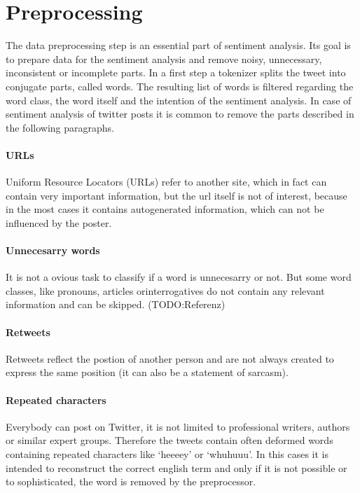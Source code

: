 \section{Preprocessing}
The data preprocessing step is an essential 
part of sentiment analysis. Its goal is to prepare data
for the sentiment analysis and remove noisy, unnecessary, 
inconsistent or incomplete parts.\autocite{Hemalatha2012}
\autocite{hemalatha2012preprocessing} In a first step a
tokenizer splits the tweet into conjugate parts, called words. 
The resulting list of words is filtered regarding the word class, 
the word itself and the intention of the sentiment analysis. 
In case of sentiment analysis of twitter posts it is common to 
remove the parts described in the following paragraphs.
\autocite{Hemalatha2012}

\paragraph{URLs}
Uniform Resource Locators (URLs) refer to another site, which 
in fact can contain very important information, but the url 
itself is not of interest, because in the most cases it 
contains autogenerated information, which can not be influenced 
by the poster.

\paragraph{Unnecesarry words}
It is not a ovious task to classify if a word is unnecesarry 
or not. But some word classes, like pronouns, articles orinterrogatives
do not contain any relevant information and can be skipped. (TODO:Referenz)

\paragraph{Retweets}
Retweets reflect the postion of another person and are not always
created to express the same position (it can also be a statement of sarcasm).

\paragraph{Repeated characters}
Everybody can post on Twitter, it is not limited 
to professional writers, authors or similar expert groups.
Therefore the tweets contain often deformed words 
containing repeated characters like `heeeey' or
`whuhuuu'. In this cases it is intended to reconstruct 
the correct english term and only if it is not 
possible or to sophisticated, the word is removed 
by the preprocessor.


